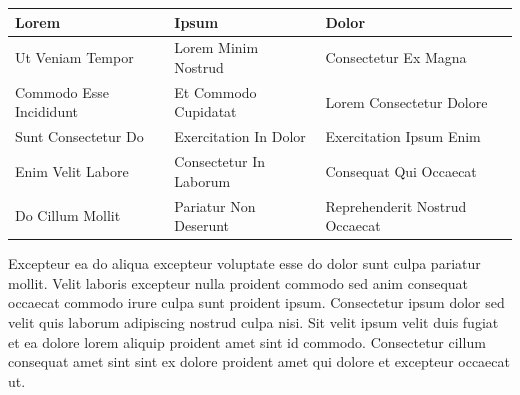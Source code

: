 \documentclass[
]{article}
\newcounter{none} %
\begin{document}
{\def\LTcaptype{none} %
\begin{longtable}[]{@{}
  >{\raggedright\arraybackslash}p{}
  >{\raggedright\arraybackslash}p{}
  >{\raggedright\arraybackslash}p{}@{}}
\toprule\noalign{}
\begin{minipage}[b]{\linewidth}\raggedright
Lorem
\end{minipage} & \begin{minipage}[b]{\linewidth}\raggedright
Ipsum
\end{minipage} & \begin{minipage}[b]{\linewidth}\raggedright
Dolor
\end{minipage} \\
\midrule\noalign{}
\endhead
\bottomrule\noalign{}
\endlastfoot
Ut Veniam Tempor & Lorem Minim Nostrud & Consectetur Ex Magna \\
Commodo Esse Incididunt & Et Commodo Cupidatat & Lorem Consectetur
Dolore \\
Sunt Consectetur Do & Exercitation In Dolor & Exercitation Ipsum Enim \\
Enim Velit Labore & Consectetur In Laborum & Consequat Qui Occaecat \\
Do Cillum Mollit & Pariatur Non Deserunt & Reprehenderit Nostrud
Occaecat \\
\end{longtable}
}

Excepteur ea do aliqua excepteur voluptate esse do dolor sunt culpa
pariatur mollit. Velit laboris excepteur nulla proident commodo sed anim
consequat occaecat commodo irure culpa sunt proident ipsum. Consectetur
ipsum dolor sed velit quis laborum adipiscing nostrud culpa nisi. Sit
velit ipsum velit duis fugiat et ea dolore lorem aliquip proident amet
sint id commodo. Consectetur cillum consequat amet sint sint ex dolore
proident amet qui dolore et excepteur occaecat ut.
\end{document}
